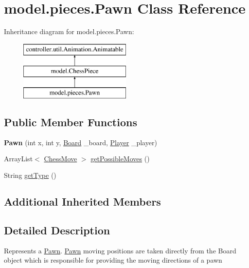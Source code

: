 \hypertarget{classmodel_1_1pieces_1_1_pawn}{\section{model.\-pieces.\-Pawn Class Reference}
\label{classmodel_1_1pieces_1_1_pawn}
}
Inheritance diagram for model.\-pieces.\-Pawn\-:\begin{figure}[H]
\begin{center}
\leavevmode
\includegraphics[height=3.000000cm]{classmodel_1_1pieces_1_1_pawn}
\end{center}
\end{figure}
\subsection*{Public Member Functions}
\begin{DoxyCompactItemize}
\item 
\hypertarget{classmodel_1_1pieces_1_1_pawn_a4335d0c4019870c84f05f87cb2e03f0c}{{\bfseries Pawn} (int x, int y, \hyperlink{classmodel_1_1board_1_1_board}{Board} \-\_\-board, \hyperlink{classcontroller_1_1_player}{Player} \-\_\-player)}\label{classmodel_1_1pieces_1_1_pawn_a4335d0c4019870c84f05f87cb2e03f0c}

\item 
Array\-List$<$ \hyperlink{classmodel_1_1_chess_move}{Chess\-Move} $>$ \hyperlink{classmodel_1_1pieces_1_1_pawn_aa8a699402fec460438fe1f9d1ba33632}{get\-Possible\-Moves} ()
\item 
String \hyperlink{classmodel_1_1pieces_1_1_pawn_a3f4abbb3b7e744569928e51f9a7ace27}{get\-Type} ()
\end{DoxyCompactItemize}
\subsection*{Additional Inherited Members}


\subsection{Detailed Description}
Represents a \hyperlink{classmodel_1_1pieces_1_1_pawn}{Pawn}. \hyperlink{classmodel_1_1pieces_1_1_pawn}{Pawn} moving positions are taken directly from the Board object which is responsible for providing the moving directions of a pawn

